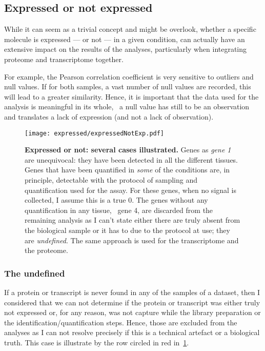 \subsection{Expressed or not expressed}
\label{sec:ExpressedOrNot}

While it can seem as a trivial concept and might be overlook, whether a specific
molecule is expressed --- or not --- in a given condition, can actually have
an extensive impact on the results of the analyses, particularly when integrating
proteome and transcriptome together.

For example, the Pearson correlation coefficient is very
sensitive to outliers and null values. If for both samples, a vast number of
null values are recorded, this will lead to a greater similarity.
Hence, it is important that the data used for the analysis is meaningful in
its whole, \ie\ a null value has still to be an observation and translates
a lack of expression (and not a lack of observation).

\begin{figure}[!htbp]
    \texttt{[image: expressed/expressedNotExp.pdf]}\centering
      \caption[Expressed or not: several cases illustrated]
      {\label{fig:DefineExpression}\textbf{Expressed or not: several cases
      illustrated.}\smallbreak{} Genes as \emph{gene 1} are unequivocal: they have been
      detected in all the different tissues. Genes that have been quantified in
      \emph{some} of the conditions are, in principle, detectable with the
      protocol of sampling and quantification used for the assay.
      For these genes, when no signal is collected, I assume this is a true $0$.
      The genes without any quantification
      in any tissue, \eg\ gene 4, are discarded from the remaining analysis as
      I can't state
      either there are truly absent from the biological sample or it has to due
      to the protocol at use; they are \emph{undefined}. The same approach is used
      for the transcriptome and the proteome.}
\end{figure}

\subsubsection{The undefined}%
\label{subsec:ExpressedOrNot-undefined}
If a protein or transcript is never found in any of the samples of a dataset,
then I considered that we can not determine if the protein or transcript was
either truly not expressed or, for any reason, was not capture while the library
preparation or the identification/quantification steps. Hence, those are
excluded from the analyses as I can not resolve precisely if this is a
technical artefact or a biological truth. This case is illustrate by the row
circled in red in~\cref{fig:DefineExpression}.

